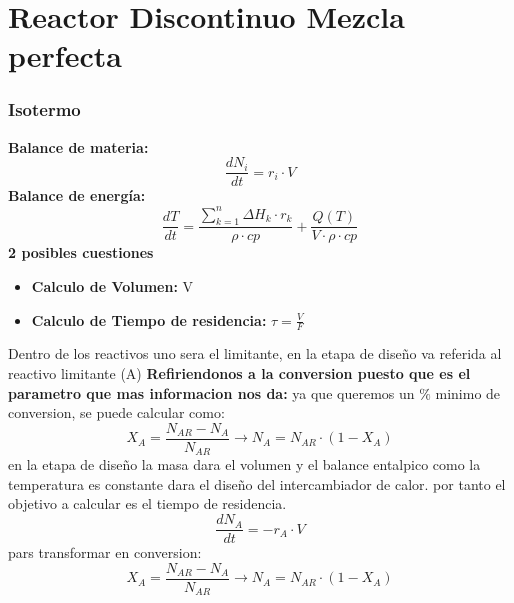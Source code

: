 \documentclass{report}
\begin{document}
\chapter{Reactor Discontinuo Mezcla perfecta}
\subsection{Isotermo}
\begin{raggedright}
	\textbf{Balance de materia:}
	\begin{equation}
		\frac{dN_i}{dt} = r_i \cdot V
	\end{equation}
	\textbf{Balance de energía:}
	\begin{equation}
		\frac{dT}{dt} = \frac{\sum_{k=1}^{n} \Delta H_k \cdot r_k}{\rho \cdot cp} + \frac{Q(T)}{V \cdot \rho \cdot cp}
	\end{equation}
\textbf{2 posibles cuestiones}
\begin{itemize}
	\item \textbf{Calculo de Volumen:} V
	\item \textbf{Calculo de Tiempo de residencia:} $\tau = \frac{V}{F}$
\end{itemize}
Dentro de los reactivos uno sera el limitante, en la etapa de diseño va referida al reactivo limitante (A)
\textbf{Refiriendonos a la conversion puesto que es el parametro que mas informacion nos da:}
ya que queremos un $\%$ minimo de conversion, se puede calcular como:
\begin{equation}
	X_A = \frac{N_{AR}-N_A}{N_{AR}} \rightarrow N_A = N_{AR} \cdot (1-X_A)
\end{equation}
en la etapa de diseño la masa dara el volumen y el balance entalpico como la temperatura es constante dara el diseño del intercambiador de calor.
por tanto el objetivo a calcular es el tiempo de residencia.
\begin{equation}
	\frac{dN_A}{dt} = -r_A \cdot V
\end{equation}
pars transformar en conversion:
\begin{equation}
	X_A = \frac{N_{AR}-N_A}{N_{AR}} \rightarrow N_A = N_{AR} \cdot (1-X_A)

\end{equation}
\end{raggedright}
\end{document}
